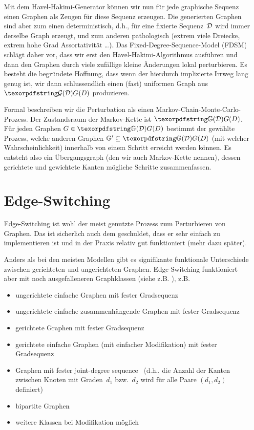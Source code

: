 Mit dem Havel-Hakimi-Generator können wir nun für jede graphische Sequenz einen Graphen als Zeugen für diese Sequenz erzeugen.
Die generierten Graphen sind aber zum einen deterministisch, d.h., für eine fixierte Sequenz~$\mathcal{D}$ wird immer derselbe Graph erzeugt, und zum anderen pathologisch (extrem viele Dreiecke, extrem hohe Grad Assortativität \ldots).
Das Fixed-Degree-Sequence-Model (FDSM) schlägt daher vor, dass wir erst den Havel-Hakimi-Algorithmus ausführen und dann den Graphen durch viele zufällige kleine Änderungen lokal perturbieren.
Es besteht die begründete Hoffnung, dass wenn der hierdurch implizierte Irrweg lang genug ist, wir dann schlussendlich einen (fast) uniformen Graph aus $\Gd$ produzieren.

Formal beschreiben wir die Perturbation als einen Markov-Chain-Monte-Carlo-Prozess.
Der Zustandsraum der Markov-Kette ist $\gd$.
Für jeden Graphen $G \in \gd$ bestimmt der gewählte Prozess, welche anderen Graphen $\mathbb G' \subseteq \gd$ (mit welcher Wahrscheinlichkeit) innerhalb von einem Schritt erreicht werden können.
Es entsteht also ein  Übergangsgraph (den wir auch Markov-Kette nennen), dessen gerichtete und gewichtete Kanten mögliche Schritte zusammenfassen.

\section{Edge-Switching}
Edge-Switching ist wohl der meist genutzte Prozess zum Perturbieren von Graphen.
Das ist sicherlich auch dem geschuldet, dass er sehr einfach zu implementieren ist und in der Praxis relativ gut funktioniert (mehr dazu später).

Anders als bei den meisten Modellen gibt es signifikante funktionale Unterschiede zwischen gerichteten und ungerichteten Graphen.
Edge-Switching funktioniert aber mit noch ausgefalleneren Graphklassen (siehe z.B. \cite{carstens_2017}), z.B.
\begin{itemize}
    \item ungerichtete einfache Graphen mit fester Gradsequenz
    \item ungerichtete einfache zusammenhängende Graphen  mit fester Gradsequenz \cite{DBLP:journals/compnet/VigerL16}
    \item gerichtete Graphen  mit fester Gradsequenz
    \item gerichtete einfache Graphen (mit einfacher Modifikation)  mit fester Gradsequenz
    \item Graphen mit fester joint-degree sequence~\cite{DBLP:conf/alenex/StantonP11} (d.h., die Anzahl der Kanten zwischen Knoten mit Graden~$d_1$ bzw.~$d_2$ wird für alle Paare $(d_1, d_2)$ definiert)
    \item bipartite Graphen
    \item weitere Klassen bei Modifikation möglich
\end{itemize}

